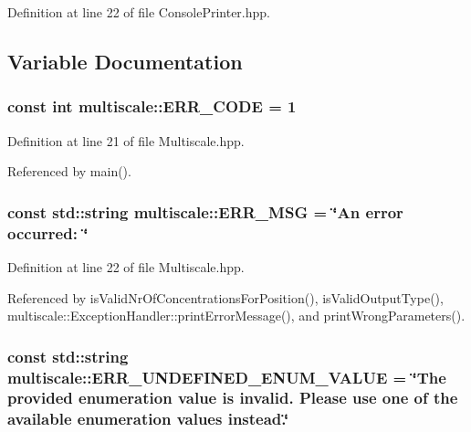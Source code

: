 \-Definition at line 22 of file \-Console\-Printer.\-hpp.



\subsection{\-Variable \-Documentation}
\hypertarget{namespacemultiscale_a4ee40795105048ee371efeeb7962ecf6}{
\subsubsection[{\-E\-R\-R\-\_\-\-C\-O\-D\-E}]{\setlength{\rightskip}{0pt plus 5cm}const int {\bf multiscale\-::\-E\-R\-R\-\_\-\-C\-O\-D\-E} = 1}}\label{namespacemultiscale_a4ee40795105048ee371efeeb7962ecf6}


\-Definition at line 21 of file \-Multiscale.\-hpp.



\-Referenced by main().

\hypertarget{namespacemultiscale_a06490e4e11ef359aa0260f96579ce584}{
\subsubsection[{\-E\-R\-R\-\_\-\-M\-S\-G}]{\setlength{\rightskip}{0pt plus 5cm}const std\-::string {\bf multiscale\-::\-E\-R\-R\-\_\-\-M\-S\-G} = \char`\"{}\-An error occurred\-: \char`\"{}}}\label{namespacemultiscale_a06490e4e11ef359aa0260f96579ce584}


\-Definition at line 22 of file \-Multiscale.\-hpp.



\-Referenced by is\-Valid\-Nr\-Of\-Concentrations\-For\-Position(), is\-Valid\-Output\-Type(), multiscale\-::\-Exception\-Handler\-::print\-Error\-Message(), and print\-Wrong\-Parameters().

\hypertarget{namespacemultiscale_a870e6a43e813a5df46b265f4986a0510}{
\subsubsection[{\-E\-R\-R\-\_\-\-U\-N\-D\-E\-F\-I\-N\-E\-D\-\_\-\-E\-N\-U\-M\-\_\-\-V\-A\-L\-U\-E}]{\setlength{\rightskip}{0pt plus 5cm}const std\-::string {\bf multiscale\-::\-E\-R\-R\-\_\-\-U\-N\-D\-E\-F\-I\-N\-E\-D\-\_\-\-E\-N\-U\-M\-\_\-\-V\-A\-L\-U\-E} = \char`\"{}\-The provided enumeration value is invalid. \-Please use one of the available enumeration values instead.\char`\"{}}}\label{namespacemultiscale_a870e6a43e813a5df46b265f4986a0510}


